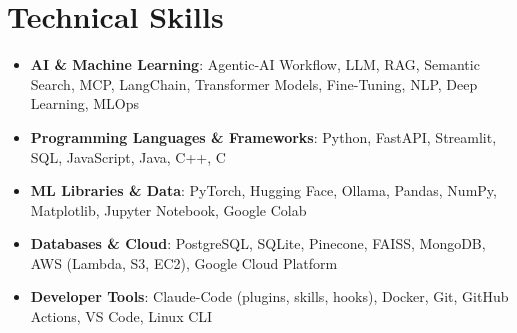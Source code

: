 \documentclass[letterpaper,11pt]{article}
\makeatletter
\newcommand{\resumeItem}[1]{\item\small{#1 \vspace{-4pt}}}
\newcommand{\resumeSubheading}[4]{
    \vspace{-2pt}\item
    \begin{tabular*}{1.0\textwidth}[t]{l@{\extracolsep{\fill}}r}
        \textbf{#1} & \textbf{\small #2} \\
        \textit{\small#3} & \textit{\small #4}
    \end{tabular*}\vspace{-7pt}
}
\newcommand{\resumeSubItem}[1]{\resumeItem{#1}\vspace{-4pt}}
\newcommand{\resumeSubHeadingListStart}{\begin{itemize}[leftmargin=0.0in, label={}]}
\newcommand{\resumeSubHeadingListEnd}{\end{itemize}}
\newcommand{\resumeItemListStart}{\begin{itemize}}
\newcommand{\resumeItemListEnd}{\end{itemize}\vspace{-7pt}}
\makeatother
\begin{document}




\vspace{-0.4cm}
\vspace{3pt}
\section{Technical Skills}
\resumeSubHeadingListStart
\resumeSubItem{\textbf{AI \& Machine Learning}{: Agentic-AI Workflow, LLM, RAG, Semantic Search, MCP, LangChain, Transformer Models, Fine-Tuning, NLP, Deep Learning, MLOps}}
\vspace{4pt}
\resumeSubItem{\textbf{Programming Languages \& Frameworks}{: Python, FastAPI, Streamlit, SQL, JavaScript, Java, C++, C}}
\vspace{4pt}
\resumeSubItem{\textbf{ML Libraries \& Data}{: PyTorch, Hugging Face, Ollama, Pandas, NumPy, Matplotlib, Jupyter Notebook, Google Colab}}
\vspace{4pt}
\resumeSubItem{\textbf{Databases \& Cloud}{: PostgreSQL, SQLite, Pinecone, FAISS, MongoDB, AWS (Lambda, S3, EC2), Google Cloud Platform}}
\vspace{4pt}
\resumeSubItem{\textbf{Developer Tools}{: Claude-Code (plugins, skills, hooks), Docker, Git, GitHub Actions, VS Code, Linux CLI}}
\resumeSubHeadingListEnd
\end{document}

